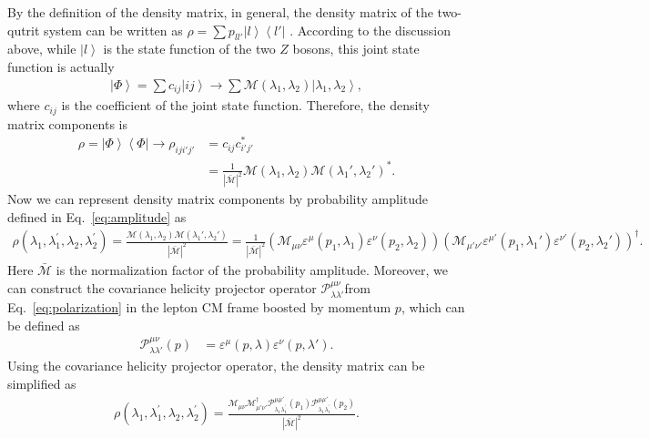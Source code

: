 \documentclass{article}
\newcommand{\ket}[1]{\left|#1\right\rangle}
\newcommand{\bra}[1]{\left\langle#1\right|}
\begin{document}
By the definition of the density matrix, in general, the density matrix of the two-qutrit system can be written as \(\rho=\sum p_{ll'}\ket{l}\bra{l'}\) . According to the discussion above, while \(\ket{l}\) is the state function of the two \(Z\) bosons, this joint state function is actually 
\begin{align}
    \ket{\Phi}=\sum c_{ij} \ket{ij}\longrightarrow\sum \mathcal{M}(\lambda_1,\lambda_2)\ket{\lambda_1,\lambda_2},
\end{align}
where \(c_{ij}\) is the coefficient of the joint state function. 
Therefore, the density matrix components is
\begin{align}
    \rho=\ket{\Phi}\bra{\Phi}\rightarrow\rho_{iji'j'}&=c_{ij}c_{i'j'}^*\\
    &=\frac{1}{|\bar{\mathcal{M}}|^2}\mathcal{M}(\lambda_1,\lambda_2)\mathcal{M}(\lambda_1',\lambda_2')^*.
\end{align}
Now we can represent density matrix components by probability amplitude defined in Eq.~\ref{eq:amplitude} as
\begin{align}
    \rho \left( \lambda _1,\lambda _{1}^{\prime},\lambda _2,\lambda _{2}^{\prime} \right) =\frac{\mathcal{M}(\lambda_1,\lambda_2)\mathcal{M}(\lambda_1',\lambda_2')}{|\bar{\mathcal{M}}|^2}= \frac{1}{|\bar{\mathcal{M}}|^2} \left( \mathcal{M} _{\mu \nu}\varepsilon ^{\mu}\left( p_1,\lambda _1 \right) \varepsilon ^{\nu}\left( p_2,\lambda _2 \right) \right) \left( \mathcal{M} _{\mu' \nu'}\varepsilon ^{\mu'}\left( p_1,\lambda _1' \right) \varepsilon ^{\nu'}\left( p_2,\lambda _2' \right) \right) ^{\dag}.
\end{align}
Here \(\bar{\mathcal{M}}\) is the normalization factor of the probability amplitude. Moreover, we can construct the covariance helicity projector operator \(\mathscr{P}_{\lambda\lambda'}^{\mu\nu}\)from Eq.~\ref{eq:polarization} in the lepton CM frame boosted by momentum \(p\), which can be defined as
\begin{align}
    \mathscr{P} _{\lambda \lambda '}^{\mu \nu}\left( p \right) &=\varepsilon ^{\mu}\left( p,\lambda \right) \varepsilon ^{\nu}\left( p,\lambda' \right).
\end{align}
Using the covariance helicity projector operator, the density matrix can be simplified as 
\begin{align}
    \rho \left( \lambda _1,\lambda _{1}^{\prime},\lambda _2,\lambda _{2}^{\prime} \right) =\frac{\mathcal{M} _{\mu \nu}\mathcal{M} _{\mu \prime\nu \prime}^{\dagger}\mathscr{P} _{\lambda _1\lambda _{1}^{\prime}}^{\mu \mu \prime}\left( p_1 \right) \mathscr{P} _{\lambda _1\lambda _{1}^{\prime}}^{\mu \mu \prime}\left( p_2 \right)}{|\bar{\mathcal{M}}|^2}.
\end{align}
\end{document}
